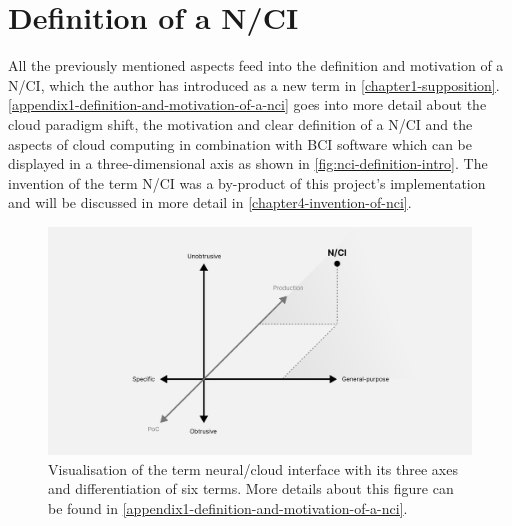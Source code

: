 \section{Definition of a N/CI}
\label{chapter2-definition-of-a-nci}

All the previously mentioned aspects feed into the definition and motivation of a N/CI, which the author has introduced as a new term in \autoref{chapter1-supposition}. \autoref{appendix1-definition-and-motivation-of-a-nci} goes into more detail about the cloud paradigm shift, the motivation and clear definition of a N/CI and the aspects of cloud computing in combination with BCI software which can be displayed in a three-dimensional axis as shown in \autoref{fig:nci-definition-intro}. The invention of the term N/CI was a by-product of this project's implementation and will be discussed in more detail in \autoref{chapter4-invention-of-nci}.

\begin{figure}[ht]
  \centering
  \includegraphics[width=\linewidth]{thesis/src/Appendix1/Figs/nci-definition.png}
  \caption[Visualisation of the term neural/cloud interface with its three axes and differentiation of six terms.]{Visualisation of the term neural/cloud interface with its three axes and differentiation of six terms. More details about this figure can be found in \autoref{appendix1-definition-and-motivation-of-a-nci}.}
  \label{fig:nci-definition-intro}
\end{figure}

